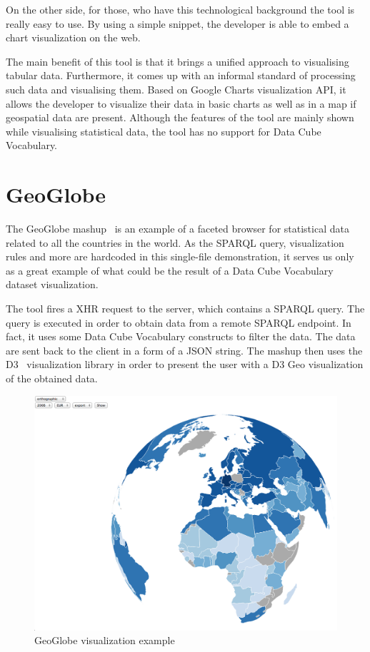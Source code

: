 On the other side, for those, who have this technological background the 
tool is really easy to use. By using a simple snippet, the developer is able to 
embed a chart visualization on the web.

The main benefit of this tool is that it brings a unified approach to 
visualising tabular data. Furthermore, it comes up with an informal standard of 
processing such data and visualising them. Based on Google Charts visualization 
API, it allows the developer to visualize their data in basic charts 
as well as in a map if geospatial data are present. Although the features of the 
tool are mainly shown while visualising statistical data, the tool has no support for 
Data Cube Vocabulary.

\section{GeoGlobe}
The GeoGlobe mashup~\cite{geoglobe} is an example of a faceted browser for 
statistical data related to all the countries in the world. As the SPARQL 
query, visualization rules and more are hardcoded in this single-file 
demonstration, it serves us only as a great example of what could be the result of a
Data Cube Vocabulary dataset visualization.

The tool fires a XHR request to the server, which contains a SPARQL query. The 
query is executed in order to obtain data from a remote SPARQL endpoint. In 
fact, it uses some Data Cube Vocabulary constructs to filter the data. The data 
are sent back to the client in a form of a JSON string. The mashup then uses the 
D3~\cite{d3} visualization library in order to present the user with a D3 Geo 
visualization of the obtained data.

\begin{figure}
	\centering
	\includegraphics[width=140mm]{img/geoglobe.png}
	\caption{GeoGlobe visualization example}
	\label{fig:geoglobe}
\end{figure}


